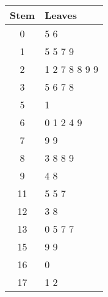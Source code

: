 \documentclass{article}
\begin{document}
\begin{center}
    \begin{tabular}{|c|l|}
        \hline
        \textbf{Stem} & \textbf{Leaves} \\
        \hline
        0 & 5 6 \\
        \hline
        1 & 5 5 7 9 \\
        \hline
        2 & 1 2 7 8 8 9 9 \\
        \hline
        3 & 5 6 7 8 \\
        \hline
        5 & 1 \\
        \hline
        6 & 0 1 2 4 9 \\
        \hline
        7 & 9 9 \\
        \hline
        8 & 3 8 8 9 \\
        \hline
        9 & 4 8 \\
        \hline
        11 & 5 5 7 \\
        \hline
        12 & 3 8 \\
        \hline
        13 & 0 5 7 7 \\
        \hline
        15 & 9 9 \\
        \hline
        16 & 0 \\
        \hline
        17 & 1 2 \\
        \hline
    \end{tabular}
\end{center}

\endgroup
\end{document}
